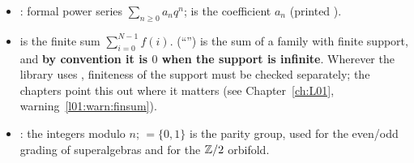 \begin{itemize}
  .
\item {}: formal power series $\sum_{n\ge0}a_nq^n$; 
  is the coefficient $a_n$ (printed ).
\item {} is the finite sum $\sum_{i=0}^{N-1}f(i)$. 
  (``'') is the sum of a family with finite support, and \textbf{by convention it is $0$
  when the support is infinite}. Wherever the library uses , finiteness of the support must
  be checked separately; the chapters point this out where it matters (see
  Chapter~\ref{ch:L01}, warning~\ref{l01:warn:finsum}).
\item {}: the integers modulo $n$;  $=\{0,1\}$ is the parity group, used for
  the even/odd grading of superalgebras and for the ${\mathbb{Z}}/2$ orbifold.
\end{itemize}

